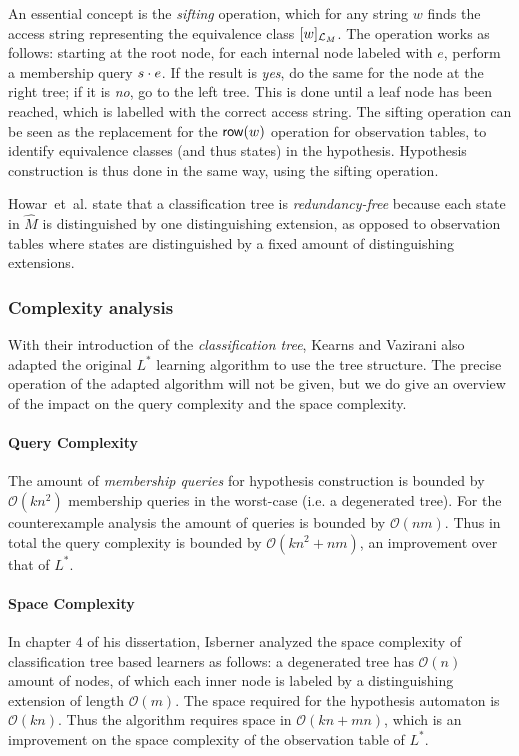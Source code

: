 \documentclass[multi,crop=false,class=article]{standalone}
\begin{document}
An essential concept is the \textit{sifting} operation, which for any string $w$
finds the access string representing the equivalence class
$[w]_{\mathcal{L}_M}$. The operation works as follows: starting at the root
node, for each internal node labeled with $e$, perform a membership query
$s \cdot e$. If the result is \textit{yes}, do the same for the node at the
right tree; if it is \textit{no}, go to the left tree. This is done until a leaf
node has been reached, which is labelled with the correct access string. The
sifting operation can be seen as the replacement for the $\mathsf{row}(w)$ operation for
observation tables, to identify equivalence classes (and thus states) in the
hypothesis. Hypothesis construction is thus done in the same way, using the
sifting operation.

Howar~et~al. state that a classification tree is \textit{redundancy-free}
because each state in $\hat M$ is distinguished by one distinguishing extension,
as opposed to observation tables where states are distinguished by a fixed
amount of distinguishing extensions\cite{Howar2014}.

\subsubsection{Complexity analysis}
\label{sec:complexity-analysis}
With their introduction of the \textit{classification tree}, Kearns and Vazirani
also adapted the original $L^*$ learning algorithm to use the tree
structure\cite{Kearns1994}. The precise operation of the adapted algorithm will
not be given, but we do give an overview of the impact on the query complexity
and the space complexity.

\paragraph{Query Complexity} The amount of \textit{membership queries} for
hypothesis construction is bounded by $\mathcal{O}(kn^2)$ membership queries in
the worst-case (i.e. a degenerated
tree)\cite{Howar2014,Kearns1994,Isberner2014b}. For the counterexample analysis
the amount of queries is bounded by $\mathcal{O}(nm)$\cite{Kearns1994}. Thus in
total the query complexity is bounded by $\mathcal{O}(kn^2 + nm)$, an
improvement over that of $L^*$.

\paragraph{Space Complexity} In chapter 4 of his dissertation, Isberner analyzed
the space complexity of classification tree based learners as follows: a
degenerated tree has $\mathcal{O}(n)$ amount of nodes, of which each inner node
is labeled by a distinguishing extension of length
$\mathcal{O}(m)$\cite{Isberner2015a}.  The space required for the hypothesis
automaton is $\mathcal{O}(kn)$\cite{Isberner2015a}. Thus the algorithm requires
space in $\mathcal{O}(kn + mn)$\cite{Isberner2014b,Isberner2015a}, which is an
improvement on the space complexity of the observation table of $L^*$.
\end{document}
